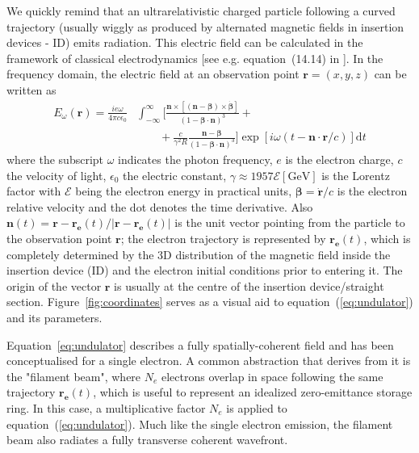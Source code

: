 \documentclass{iucr}
\newcommand{\inblue}[1]{{\color{blue}#1}}
\begin{document}
We quickly remind that an ultrarelativistic charged particle following a curved trajectory (usually wiggly as produced by alternated magnetic fields in insertion devices - ID) emits radiation. This electric field can be calculated in the framework of classical electrodynamics [see e.g. equation~(14.14) in \cite{jackson}]. In the frequency domain, the electric field at an observation point $\textbf{r}=(x,y,z)$ can be written as 
\begin{equation}
\begin{split}
    E_{\omega}(\textbf{r}) = \frac{i e \omega}{4 \pi c \epsilon_0} 
    &\int_{-\infty}^{\infty}
    \biggl[ 
    \frac{\textbf{n} \times [(\textbf{n} - \mathbf{\beta}) \times \dot{\mathbf{\beta}}]}
    {(1- \mathbf{\beta} \cdot \textbf{n})^3} +\\
    &\qquad+\frac{c}{\gamma^2 R}   \frac{\textbf{n} - \mathbf{\beta}}{(1-\mathbf{\beta} \cdot \textbf{n})^3} \biggr]
    \exp[i \omega (t - \textbf{n}\cdot\textbf{r}/c)] \mathrm{d}t
\end{split}\label{eq:undulator}
\end{equation}
where the subscript $\omega$ indicates the photon frequency, $e$ is the electron charge, $c$ the velocity of light, $\epsilon_0$ the electric constant, $\gamma \approx 1957\mathcal{E}[\mathrm{GeV}]$ is the Lorentz factor with $\mathcal{E}$ being the electron energy in practical units, $\mathbf{\beta}=\dot{\mathbf{r}}\big/c$ is the electron relative velocity and the dot denotes the time derivative.
Also $\textbf{n}(t)=\textbf{r}-\textbf{r}_{\textbf{e}}(t)\big/|\textbf{r}-\textbf{r}_{\textbf{e}}(t)|$ is the unit vector pointing from the particle to the observation point $\textbf{r}$; the electron trajectory is represented by $\textbf{r}_{\textbf{e}}(t)$, which is completely determined by the 3D distribution of the magnetic field inside the insertion device (ID) and the electron initial conditions prior to entering it. The origin of the vector $\textbf{r}$ is usually at the centre of the insertion device/straight section. \inblue{Figure~\ref{fig:coordinates}} serves as a visual aid to equation~(\ref{eq:undulator}) and its parameters. 

Equation~\ref{eq:undulator} describes a fully spatially-coherent field and has been conceptualised for a single electron. A common abstraction that derives from it is the "filament beam", where $N_e$ electrons overlap in space following the same trajectory $\textbf{r}_{\textbf{e}}(t)$, which is useful to  represent an idealized zero-emittance storage ring. In this case, a multiplicative factor $N_e$ is applied to equation~(\ref{eq:undulator}). Much like the single electron emission, the filament beam also radiates a fully transverse coherent wavefront.
\end{document}
